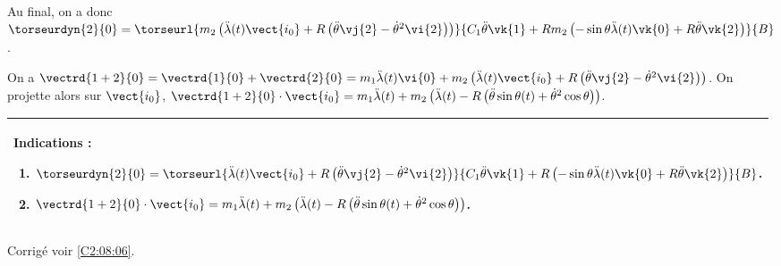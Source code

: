 Au final, on a donc $\torseurdyn{2}{0}=\torseurl{%
m_2\left(\ddot{\lambda}(t) \vect{i_0} + R \left(\ddot{\theta} \vj{2} - \dot{\theta}^2 \vi{2}\right)\right)
}{%
C_1  \ddot{\theta} \vk{1} + Rm_2\left( -\sin \theta \ddot{\lambda}(t) \vk{0} + R \ddot{\theta} \vk{2}\right)
}{B}$.
\else
\fi

\ifprof

On a $\vectrd{1+2}{0}=\vectrd{1}{0}+\vectrd{2}{0}=m_1\ddot{\lambda}(t)\vi{0}+m_2\left(\ddot{\lambda}(t) \vect{i_0} + R \left(\ddot{\theta} \vj{2} - \dot{\theta}^2 \vi{2}\right)\right)$.
On projette alors sur $\vect{i_0}$,
$\vectrd{1+2}{0}\cdot \vect{i_0} =m_1\ddot{\lambda}(t)+m_2\left(\ddot{\lambda}(t)-R \left(\ddot{\theta} \sin\theta(t)  + \dot{\theta}^2 \cos\theta \right)\right) $.
\else
\fi

\ifprof
\else
\footnotesize
\begin{center}
\begin{tabular}{|p{.9\linewidth}|}
\hline
Indications :
\begin{enumerate}
\item $\torseurdyn{2}{0}=\torseurl{\ddot{\lambda}(t) \vect{i_0} + R \left(\ddot{\theta} \vj{2} - \dot{\theta}^2 \vi{2}\right)}{C_1  \ddot{\theta} \vk{1} + R\left( -\sin \theta \ddot{\lambda}(t) \vk{0} + R \ddot{\theta} \vk{2}\right)}{B}$.
\item $\vectrd{1+2}{0}\cdot \vect{i_0}=m_1\ddot{\lambda}(t)+m_2\left(\ddot{\lambda}(t)- R \left(\ddot{\theta} \sin\theta(t)  + \dot{\theta}^2 \cos\theta \right)\right)$. 
\end{enumerate} \\ \hline
\end{tabular}
\end{center}
\normalsize
\begin{flushright}
\footnotesize{Corrigé  voir \ref{C2:08:06}.}
\end{flushright}%
\fi